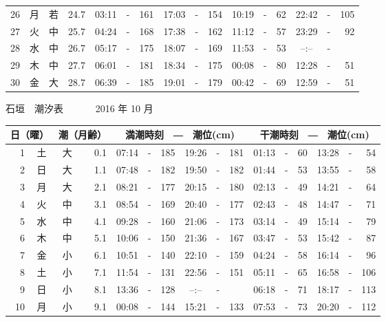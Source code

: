 \documentclass[12pt.a4j]{jsarticle}
\begin{document}
\begin{center}
\begin{table}[ht]
\begin{tabular}{|rc|cr|ccrccr|ccrccr|}
26 & 月 & 若 & 24.7 &  03:11 &-& 161  &  17:03 &-& 154  &   10:19 &-&  62  &   22:42 &-& 105  \\
27 & 火 & 中 & 25.7 &  04:24 &-& 168  &  17:38 &-& 162  &   11:12 &-&  57  &   23:29 &-&  92  \\
28 & 水 & 中 & 26.7 &  05:17 &-& 175  &  18:07 &-& 169  &   11:53 &-&  53  &   --:-- &-&     \\
29 & 木 & 中 & 27.7 &  06:01 &-& 181  &  18:34 &-& 175  &   00:08 &-&  80  &   12:28 &-&  51  \\
30 & 金 & 大 & 28.7 &  06:39 &-& 185  &  19:01 &-& 179  &   00:42 &-&  69  &   12:59 &-&  51  \\
   \hline
   \end{tabular}
\end{table}
\newpage
 {\LARGE 石垣　潮汐表　　　}
 {\large 2016 年 10 月}\\
 \begin{table}[ht]
    \begin{tabular}{|rc|cr|ccrccr|ccrccr|}
    \hline
    \multicolumn{2}{|c|}{日（曜）} & \multicolumn{2}{c|}{潮（月齢）} & \multicolumn{6}{c|}{満潮時刻　―　潮位(cm)} & \multicolumn{6}{c|}{干潮時刻　―　潮位(cm)} \\
 \hline
 1 & 土 & 大 &  0.1 &  07:14 &-& 185  &  19:26 &-& 181  &   01:13 &-&  60  &   13:28 &-&  54  \\
 2 & 日 & 大 &  1.1 &  07:48 &-& 182  &  19:50 &-& 182  &   01:44 &-&  53  &   13:55 &-&  58  \\
 3 & 月 & 大 &  2.1 &  08:21 &-& 177  &  20:15 &-& 180  &   02:13 &-&  49  &   14:21 &-&  64  \\
 4 & 火 & 中 &  3.1 &  08:54 &-& 169  &  20:40 &-& 177  &   02:43 &-&  48  &   14:47 &-&  71  \\
 5 & 水 & 中 &  4.1 &  09:28 &-& 160  &  21:06 &-& 173  &   03:14 &-&  49  &   15:14 &-&  79  \\
 6 & 木 & 中 &  5.1 &  10:06 &-& 150  &  21:36 &-& 167  &   03:47 &-&  53  &   15:42 &-&  87  \\
 7 & 金 & 小 &  6.1 &  10:51 &-& 140  &  22:10 &-& 159  &   04:24 &-&  58  &   16:14 &-&  96  \\
 8 & 土 & 小 &  7.1 &  11:54 &-& 131  &  22:56 &-& 151  &   05:11 &-&  65  &   16:58 &-& 106  \\
 9 & 日 & 小 &  8.1 &  13:36 &-& 128  &  --:-- &-&     &   06:18 &-&  71  &   18:17 &-& 113  \\
10 & 月 & 小 &  9.1 &  00:08 &-& 144  &  15:21 &-& 133  &   07:53 &-&  73  &   20:20 &-& 112  \\

\end{tabular}
\end{table}
\end{center}
\end{document}
